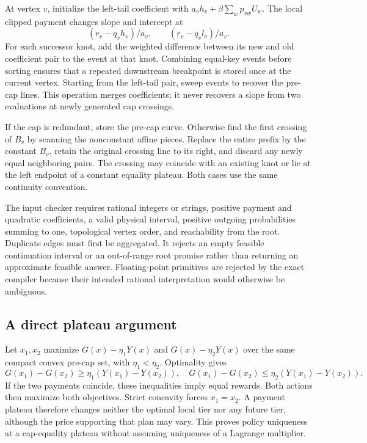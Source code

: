 At vertex $v$, initialize the left-tail coefficient with $a_vh_v+\beta\sum_wp_{vw}U_w$. The local clipped payment changes slope and intercept at
\[
 (r_v-q_vh_v)/a_v,\qquad (r_v-q_vl_v)/a_v.
\]
For each successor knot, add the weighted difference between its new and old coefficient pair to the event at that knot. Combining equal-key events before sorting ensures that a repeated downstream breakpoint is stored once at the current vertex. Starting from the left-tail pair, sweep events to recover the pre-cap lines. This operation merges coefficients; it never recovers a slope from two evaluations at newly generated cap crossings.

If the cap is redundant, store the pre-cap curve. Otherwise find the first crossing of $B_v$ by scanning the nonconstant affine pieces. Replace the entire prefix by the constant $B_v$, retain the original crossing line to its right, and discard any newly equal neighboring pairs. The crossing may coincide with an existing knot or lie at the left endpoint of a constant equality plateau. Both cases use the same continuity convention.

The input checker requires rational integers or strings, positive payment and quadratic coefficients, a valid physical interval, positive outgoing probabilities summing to one, topological vertex order, and reachability from the root. Duplicate edges must first be aggregated. It rejects an empty feasible continuation interval or an out-of-range root promise rather than returning an approximate feasible answer. Floating-point primitives are rejected by the exact compiler because their intended rational interpretation would otherwise be ambiguous.

\subsection{A direct plateau argument}
Let $x_1,x_2$ maximize $G(x)-\eta_1Y(x)$ and $G(x)-\eta_2Y(x)$ over the same compact convex pre-cap set, with $\eta_1<\eta_2$. Optimality gives
\[
 G(x_1)-G(x_2)\geq\eta_1(Y(x_1)-Y(x_2)),\quad
 G(x_1)-G(x_2)\leq\eta_2(Y(x_1)-Y(x_2)).
\]
If the two payments coincide, these inequalities imply equal rewards. Both actions then maximize both objectives. Strict concavity forces $x_1=x_2$. A payment plateau therefore changes neither the optimal local tier nor any future tier, although the price supporting that plan may vary. This proves policy uniqueness at a cap-equality plateau without assuming uniqueness of a Lagrange multiplier.

